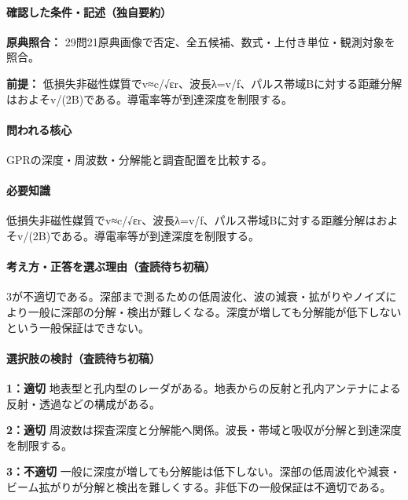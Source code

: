 \paragraph{確認した条件・記述（独自要約）}\mbox{}\par

\noindent\textbf{原典照合：} 29問21原典画像で否定、全五候補、数式・上付き単位・観測対象を照合。\par

\noindent\textbf{前提：} 低損失非磁性媒質でv≈c/√εr、波長λ=v/f、パルス帯域Bに対する距離分解はおよそv/(2B)である。導電率等が到達深度を制限する。\par

\paragraph{問われる核心} GPRの深度・周波数・分解能と調査配置を比較する。

\paragraph{必要知識} 低損失非磁性媒質でv≈c/√εr、波長λ=v/f、パルス帯域Bに対する距離分解はおよそv/(2B)である。導電率等が到達深度を制限する。

\paragraph{考え方・正答を選ぶ理由（査読待ち初稿）} 3が不適切である。深部まで測るための低周波化、波の減衰・拡がりやノイズにより一般に深部の分解・検出が難しくなる。深度が増しても分解能が低下しないという一般保証はできない。

\paragraph{選択肢の検討（査読待ち初稿）}\mbox{}\par

\noindent\textbf{1：適切} 地表型と孔内型のレーダがある。地表からの反射と孔内アンテナによる反射・透過などの構成がある。\par

\noindent\textbf{2：適切} 周波数は探査深度と分解能へ関係。波長・帯域と吸収が分解と到達深度を制限する。\par

\noindent\textbf{3：不適切} 一般に深度が増しても分解能は低下しない。深部の低周波化や減衰・ビーム拡がりが分解と検出を難しくする。非低下の一般保証は不適切である。\par

